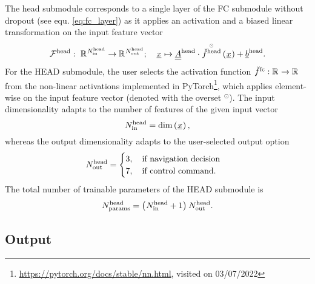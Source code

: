 The head submodule
corresponds to a single layer of the FC submodule
without dropout (see equ. \ref{eq:fc_layer})
as it
applies an activation and a biased linear transformation on the
input feature vector
\begin{align} \label{eq:head}
    \headMap
    :\ 
    \R{\headIn}
    \rightarrow 
    \R{\headOut}
    ;\quad 
    \featvec[]{}{}{}{}
    \mapsto
    \headMat \cdot \hadfct{\headAct}\left(\featvec[]{}{}{}{}\right)
    + \headBias
    .
\end{align}
For the HEAD submodule, the user selects
the activation function $\fcAct : \R{} \rightarrow \R{}$
from the non-linear activations implemented in PyTorch\footnote{
        \url{https://pytorch.org/docs/stable/nn.html}, visited on 03/07/2022
    },
which applies element-wise on the input feature vector (denoted with the overset ${}^\odot$).
The input dimensionality adapts to the
number of features of the given input vector
\begin{equation}
    \headIn
    =
    \dim \left(\featvec[]{}{}{}{}\right),
\end{equation}
whereas the output dimensionality
adapts to the user-selected output option
\begin{equation}
    \headOut
    = 
    \begin{cases}
        3
        ,\quad 
        \text{if navigation decision} 
        \\
        7
        ,\quad 
        \text{if control command.} 
    \end{cases}
\end{equation}
The total number of trainable parameters of the HEAD submodule is
\begin{equation} \label{eq:head_param}
    \headParam = \left( \headIn + 1 \right) \headOut
    .
\end{equation}






%
\subsection*{Output}










